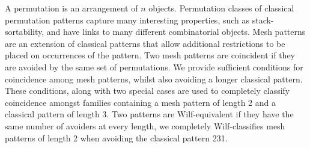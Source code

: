 A permutation is an arrangement of \(n\) objects.
Permutation classes of classical permutation patterns
capture many interesting properties, such as
stack-sortability, and have links to many different combinatorial objects.
Mesh patterns are an extension of classical patterns that allow additional
restrictions to be placed on occurrences of the pattern.
Two mesh patterns are coincident if they are avoided by the same set of
permutations. We provide sufficient conditions for
coincidence among mesh patterns, whilst also avoiding a longer classical
pattern. These conditions, along with two special cases are used to completely
classify coincidence amongst families containing a mesh pattern of length 2
and a classical pattern of length 3. Two patterns are Wilf-equivalent if they
have the same number of avoiders at every length, we completely
Wilf-classifies mesh patterns of length 2 when avoiding the classical pattern 231.
